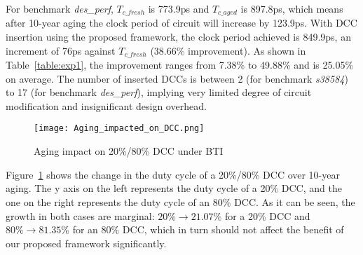 For benchmark \textit{des\_perf}, $T_{c\_fresh}$ is 773.9ps and $T_{c\_aged}$ is 897.8ps, which means after 10-year aging the clock period of circuit will increase by 123.9ps. With DCC insertion using the proposed framework, the clock period achieved is 849.9ps, an increment of 76ps against $T_{c\_fresh}$ (38.66\% improvement). As shown in Table~\ref{table:exp1}, the improvement ranges from 7.38\% to 49.88\% and is 25.05\% on average. \iffalse As shown in Table~\ref{table:exp2}.\fi The number of inserted DCCs is between 2 (for benchmark \textit{s38584}) to 17 (for benchmark \textit{des\_perf}), implying very limited degree of circuit modification and insignificant design overhead.



\begin{figure}
    \centering
    \texttt{[image: Aging\_impacted\_on\_DCC.png]}
    \caption{Aging impact on 20\%/80\% DCC under BTI}
    \label{fig:exp4}
\end{figure}

Figure~\ref{fig:exp4} shows the change in the duty cycle of a 20\%/80\% DCC over 10-year aging. The y axis on the left represents the duty cycle of a 20\% DCC, and the one on the right represents the duty cycle of an 80\% DCC. As it can be seen, the growth in both cases are marginal: $20\% \to 21.07\%$ for a 20\% DCC and $80\% \to 81.35\%$ for an 80\% DCC, which in turn should not affect the benefit of our proposed framework significantly.